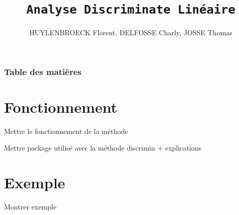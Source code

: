\documentclass[b]{beamer}
\title{\texttt{Analyse Discriminate Linéaire}}
\author{HUYLENBROECK Florent, DELFOSSE Charly, JOSSE Thomas}
\begin{document}
	\begin{frame}
		\titlepage
	\end{frame}

	\begin{frame}
		\frametitle{Table des matières}
		\tableofcontents
	\end{frame}
	\section{Fonctionnement}
	\begin{frame}
		Mettre le fonctionnement de la méthode 
	\end{frame}

	\begin{frame}
		Mettre package utilisé avec la méthode discrimin + explications
	\end{frame}
	\section{Exemple}
	\begin{frame}
		Montrer exemple
	\end{frame}
\end{document}
